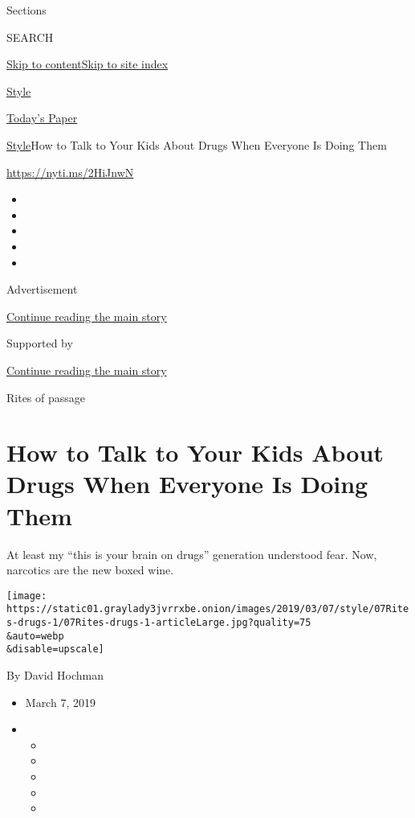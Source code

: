 Sections

SEARCH

\protect\hyperlink{site-content}{Skip to
content}\protect\hyperlink{site-index}{Skip to site index}

\href{https://www.nytimes3xbfgragh.onion/section/style}{Style}

\href{https://myaccount.nytimes3xbfgragh.onion/auth/login?response_type=cookie\&client_id=vi}{}

\href{https://www.nytimes3xbfgragh.onion/section/todayspaper}{Today's
Paper}

\href{/section/style}{Style}\textbar{}How to Talk to Your Kids About
Drugs When Everyone Is Doing Them

\url{https://nyti.ms/2HiJnwN}

\begin{itemize}
\item
\item
\item
\item
\item
\end{itemize}

Advertisement

\protect\hyperlink{after-top}{Continue reading the main story}

Supported by

\protect\hyperlink{after-sponsor}{Continue reading the main story}

Rites of passage

\hypertarget{how-to-talk-to-your-kids-about-drugs-when-everyone-is-doing-them}{%
\section{How to Talk to Your Kids About Drugs When Everyone Is Doing
Them}\label{how-to-talk-to-your-kids-about-drugs-when-everyone-is-doing-them}}

At least my ``this is your brain on drugs'' generation understood fear.
Now, narcotics are the new boxed wine.

\texttt{[image: https://static01.graylady3jvrrxbe.onion/images/2019/03/07/style/07Rites-drugs-1/07Rites-drugs-1-articleLarge.jpg?quality=75\\\&auto=webp\\\&disable=upscale]}

By David Hochman

\begin{itemize}
\item
  March 7, 2019
\item
  \begin{itemize}
  \item
  \item
  \item
  \item
  \item
  \end{itemize}
\end{itemize}

